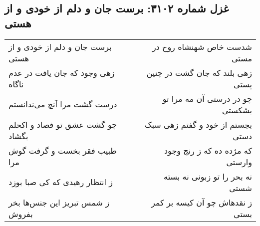 \begin{center}
\section*{غزل شماره ۳۱۰۲: برست جان و دلم از خودی و از هستی}
\label{sec:3102}
\begin{longtable}{l p{0.5cm} r}
برست جان و دلم از خودی و از هستی
&&
شدست خاص شهنشاه روح در مستی
\\
زهی وجود که جان یافت در عدم ناگاه
&&
زهی بلند که جان گشت در چنین پستی
\\
درست گشت مرا آنچ می‌ندانستم
&&
چو در درستی آن مه مرا تو بشکستی
\\
چو گشت عشق تو فصاد و اکحلم بگشاد
&&
بجستم از خود و گفتم زهی سبک دستی
\\
طبیب فقر بخست و گرفت گوش مرا
&&
که مژده ده که ز رنج وجود وارستی
\\
ز انتظار رهیدی که کی صبا بوزد
&&
نه بحر را تو زبونی نه بسته شستی
\\
ز شمس تبریز این جنس‌ها بخر بفروش
&&
ز نقدهاش چو آن کیسه بر کمر بستی
\\
\end{longtable}
\end{center}
